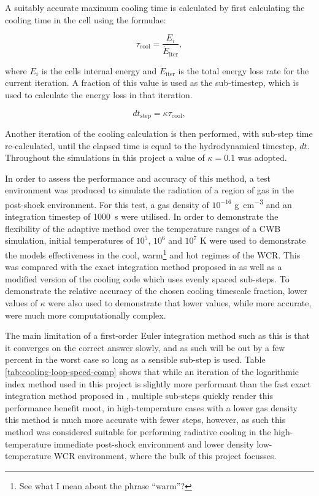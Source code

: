 A suitably accurate maximum cooling time is calculated by first calculating the cooling time in the cell using the formulae:

\begin{equation}
  \tau_\text{cool} = \frac{E_i}{\dot{E}_\text{iter}},
\end{equation}

\noindent
where $E_i$ is the cells internal energy and $\dot{E}_\text{iter}$ is the total energy loss rate for the current iteration.
A fraction of this value is used as the sub-timestep, which is used to calculate the energy loss in that iteration.

\begin{equation}
  dt_\text{step} = \kappa \tau_\text{cool}, \label{eq:kappafirstuse}
\end{equation}

\noindent
Another iteration of the cooling calculation is then performed, with sub-step time re-calculated, until the elapsed time is equal to the hydrodynamical timestep, $dt$. Throughout the simulations in this project a value of $\kappa = 0.1$ was adopted.

In order to assess the performance and accuracy of this method, a test environment was produced to simulate the radiation of a region of gas in the post-shock environment.
For this test, a gas density of $10^{-16}$ \si{\gram\per\centi\metre\cubed} and an integration timestep of \SI{1000}{\second} were utilised.
In order to demonstrate the flexibility of the adaptive method over the temperature ranges of a CWB simulation, initial temperatures of $10^5$, $10^6$ and $10^7$ \si{\kelvin} were used to demonstrate the models effectiveness in the cool, warm\footnote{See what I mean about the phrase ``warm''?} and hot regimes of the WCR.
This was compared with the exact integration method proposed in \cite{townsendExactIntegrationScheme2009} as well as a modified version of the cooling code which uses evenly spaced sub-steps. To demonstrate the relative accuracy of the chosen cooling timescale fraction, lower values of $\kappa$ were also used to demonstrate that lower values, while more accurate, were much more computationally complex.


The main limitation of a first-order Euler integration method such as this is that it converges on the correct answer slowly, and as such will be out by a few percent in the worst case so long as a sensible sub-step is used.
Table \ref{tab:cooling-loop-speed-comp} shows that while an iteration of the logarithmic index method used in this project is slightly more performant than the fast exact integration method proposed in \cite{townsendExactIntegrationScheme2009}, multiple sub-steps quickly render this performance benefit moot, in high-temperature cases with a lower gas density this method is much more accurate with fewer steps, however, as such this method was considered suitable for performing radiative cooling in the high-temperature immediate post-shock environment and lower density low-temperature WCR environment, where the bulk of this project focusses.

